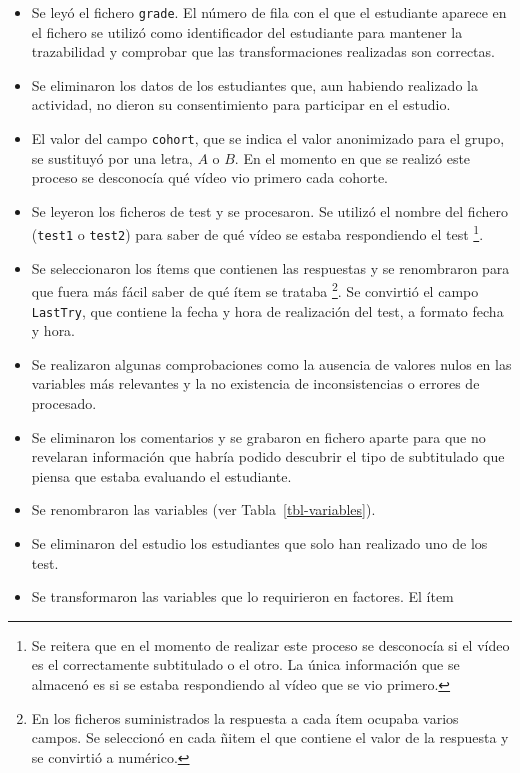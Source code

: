 \documentclass[
  12pt,
  a4paper,
  extrafontsizes,
  onecolumn,
  openright,
  table]{memoir}
\begin{document}
\begin{itemize}
\item
  Se leyó el fichero \texttt{grade}. El número de fila con el que el
  estudiante aparece en el fichero se utilizó como identificador del
  estudiante para mantener la trazabilidad y comprobar que las
  transformaciones realizadas son correctas.
\item
  Se eliminaron los datos de los estudiantes que, aun habiendo realizado
  la actividad, no dieron su consentimiento para participar en el
  estudio.
\item
  El valor del campo \texttt{cohort}, que se indica el valor anonimizado
  para el grupo, se sustituyó por una letra, \(A\) o \(B\). En el
  momento en que se realizó este proceso se desconocía qué vídeo vio
  primero cada cohorte.
\item
  Se leyeron los ficheros de test y se procesaron. Se utilizó el nombre
  del fichero (\texttt{test1} o \texttt{test2}) para saber de qué vídeo
  se estaba respondiendo el test \footnote{Se reitera que en el momento
    de realizar este proceso se desconocía si el vídeo es el
    correctamente subtitulado o el otro. La única información que se
    almacenó es si se estaba respondiendo al vídeo que se vio primero.}.
\item
  Se seleccionaron los ítems que contienen las respuestas y se
  renombraron para que fuera más fácil saber de qué ítem se trataba
  \footnote{En los ficheros suministrados la respuesta a cada ítem
    ocupaba varios campos. Se seleccionó en cada ñitem el que contiene
    el valor de la respuesta y se convirtió a numérico.}. Se convirtió
  el campo \texttt{LastTry}, que contiene la fecha y hora de realización
  del test, a formato fecha y hora.
\item
  Se realizaron algunas comprobaciones como la ausencia de valores nulos
  en las variables más relevantes y la no existencia de inconsistencias
  o errores de procesado.
\item
  Se eliminaron los comentarios y se grabaron en fichero aparte para que
  no revelaran información que habría podido descubrir el tipo de
  subtitulado que piensa que estaba evaluando el estudiante.
\item
  Se renombraron las variables (ver Tabla~\ref{tbl-variables}).
\item
  Se eliminaron del estudio los estudiantes que solo han realizado uno
  de los test.
\item
  Se transformaron las variables que lo requirieron en factores. El ítem

\end{itemize}
\end{document}

